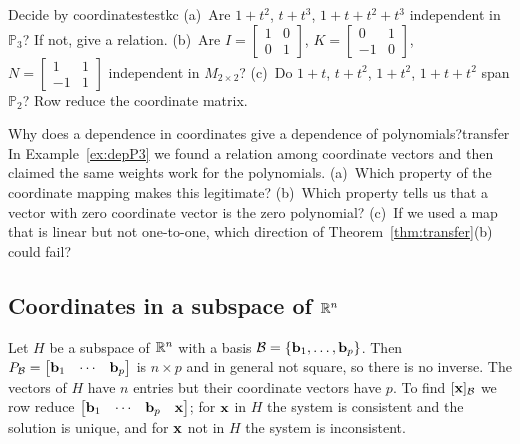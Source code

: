 \documentclass[11pt]{article}
\begin{document}
\begin{kc}{Decide by coordinates}{testkc}
(a)~Are $1+t^2$, $t+t^3$, $1+t+t^2+t^3$ independent in $\mathbb{P}_3$? If not, give a relation. (b)~Are $I=\begin{bmatrix}1&0\\0&1\end{bmatrix}$, $K=\begin{bmatrix}0&1\\-1&0\end{bmatrix}$, $N=\begin{bmatrix}1&1\\-1&1\end{bmatrix}$ independent in $M_{2\times2}$? (c)~Do $1+t$, $t+t^2$, $1+t^2$, $1+t+t^2$ span $\mathbb{P}_2$? Row reduce the coordinate matrix.
\end{kc}

\begin{think}{Why does a dependence in coordinates give a dependence of polynomials?}{transfer}
In Example~\ref{ex:depP3} we found a relation among coordinate vectors and then claimed the same weights work for the polynomials. (a)~Which property of the coordinate mapping makes this legitimate? (b)~Which property tells us that a vector with zero coordinate vector is the zero polynomial? (c)~If we used a map that is linear but not one-to-one, which direction of Theorem~\ref{thm:transfer}(b) could fail?
\end{think}

\subsection*{Coordinates in a subspace of $\mathbb{R}^n$}

Let $H$ be a subspace of $\mathbb{R}^n$ with a basis $\mathcal{B}=\{\mathbf{b}_1,\dots,\mathbf{b}_p\}$. Then $P_{\mathcal{B}}=\begin{bmatrix}\mathbf{b}_1&\cdots&\mathbf{b}_p\end{bmatrix}$ is $n\times p$ and in general not square, so there is no inverse. The vectors of $H$ have $n$ entries but their coordinate vectors have $p$. To find $[\mathbf{x}]_{\mathcal{B}}$ we row reduce $\begin{bmatrix}\mathbf{b}_1&\cdots&\mathbf{b}_p&\mathbf{x}\end{bmatrix}$; for $\mathbf{x}$ in $H$ the system is consistent and the solution is unique, and for $\mathbf{x}$ not in $H$ the system is inconsistent.
\end{document}
